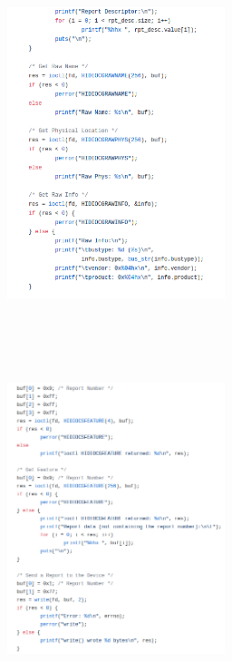 \documentclass[conference]{IEEEtran}
\begin{document}
\begin{figure}[!htb]
\centering
\includegraphics[width=2.5in, height=4in]{Imagens/hid3}
\end{figure}
\begin{figure}[!htb]
\centering
\includegraphics[width=2.5in, height=4in]{Imagens/hid4}
\end{figure}
\end{document}
